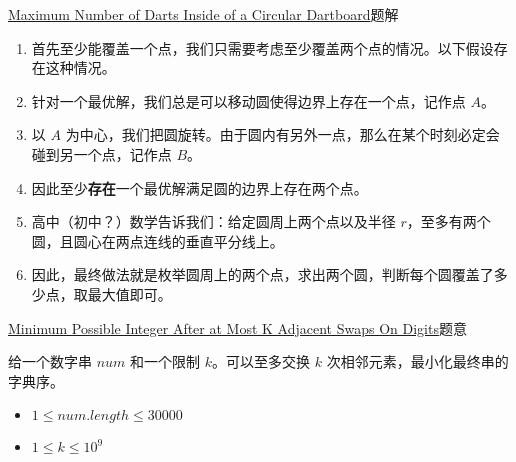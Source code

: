 \documentclass{beamer}
\begin{document}
\begin{frame}{\href{https://leetcode.com/problems/maximum-number-of-darts-inside-of-a-circular-dartboard/}{Maximum Number of Darts Inside of a Circular Dartboard}}{题解}

\begin{enumerate}
    \item 首先至少能覆盖一个点，我们只需要考虑至少覆盖两个点的情况。以下假设存在这种情况。
    \item 针对一个最优解，我们总是可以移动圆使得边界上存在一个点，记作点 $A$。
    \item 以 $A$ 为中心，我们把圆旋转。由于圆内有另外一点，那么在某个时刻必定会碰到另一个点，记作点 $B$。
    \item 因此至少\textbf{存在}一个最优解满足圆的边界上存在两个点。
    \item 高中（初中？）数学告诉我们：给定圆周上两个点以及半径 $r$，至多有两个圆，且圆心在两点连线的垂直平分线上。
    \item 因此，最终做法就是枚举圆周上的两个点，求出两个圆，判断每个圆覆盖了多少点，取最大值即可。
\end{enumerate}
\end{frame}





\begin{frame}{\href{https://leetcode.com/problems/minimum-possible-integer-after-at-most-k-adjacent-swaps-on-digits/}{Minimum Possible Integer After at Most K Adjacent Swaps On Digits}}{题意}

给一个数字串 $num$ 和一个限制 $k$。可以至多交换 $k$ 次相邻元素，最小化最终串的字典序。

\begin{itemize}
    \item $1 \le num.length \le 30000$
    \item $1\le k \le 10^9$
\end{itemize}
\end{frame}
\end{document}
